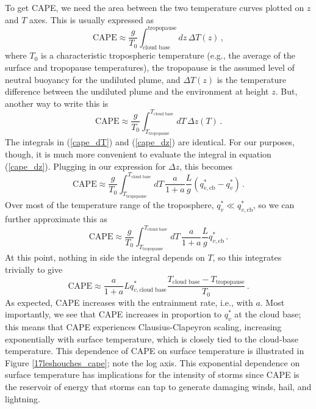 \documentclass[12pt]{article}
\newcommand{\cape}{{\text{CAPE}}}
\begin{document}
To get CAPE, we need the area between the two temperature curves plotted on $z$ and $T$ axes.  This is usually expressed as
\begin{equation}
\cape \approx \frac{g}{T_0} \int_{\text{cloud base}}^{\text{tropopause}} dz \, \Delta T(z) \, , \label{cape_dT}
\end{equation}
where $T_0$ is a characteristic tropospheric temperature (e.g., the average of the surface and tropopause temperatures), the tropopause is the assumed level of neutral buoyancy for the undiluted plume, and $\Delta T(z)$ is the temperature difference between the undiluted plume and the environment at height $z$.  But, another way to write this is
\begin{equation}
\cape \approx \frac{g}{T_0} \int_{T_{\text{tropopause}}}^{T_{\text{cloud base}}} dT \, \Delta z(T) \, . \label{cape_dz}
\end{equation}
The integrals in (\ref{cape_dT}) and (\ref{cape_dz}) are identical.  For our purposes, though, it is much more convenient to evaluate the integral in equation (\ref{cape_dz}).  Plugging in our expression for $\Delta z$, this becomes
\[
\cape \approx \frac{g}{T_0} \int_{T_{\text{tropopause}}}^{T_{\text{cloud base}}} dT \, \frac{a}{1+a} \frac{L}{g} \left( q_{v,\text{cb}}^* - q_v^* \right) \, .
\]
Over most of the temperature range of the troposphere, $q_v^* \ll q_{v,\text{cb}}^*$, so we can further approximate this as
\[
\cape \approx \frac{g}{T_0} \int_{T_{\text{tropopause}}}^{T_{\text{cloud base}}} dT \, \frac{a}{1+a} \frac{L}{g} q_{v,\text{cb}}^* \, .
\]
At this point, nothing in side the integral depends on $T$, so this integrates trivially to give
\begin{equation}
\cape \approx \frac{a}{1+a} L q_{v,\text{cloud base}}^* \frac{T_{\text{cloud base}} - T_{\text{tropopause}}}{T_0} \, . \label{cape_simple}
\end{equation}
As expected, CAPE increases with the entrainment rate, i.e., with $a$.  Most importantly, we see that CAPE increases in proportion to $q_v^*$ at the cloud base; this means that CAPE experiences Clausius-Clapeyron scaling, increasing exponentially with surface temperature, which is closely tied to the cloud-base temperature.  This dependence of CAPE on surface temperature is illustrated in Figure \ref{17leshouches_cape}; note the log axis.  This exponential dependence on surface temperature has implications for the intensity of storms since CAPE is the reservoir of energy that storms can tap to generate damaging winds, hail, and lightning.
\end{document}
